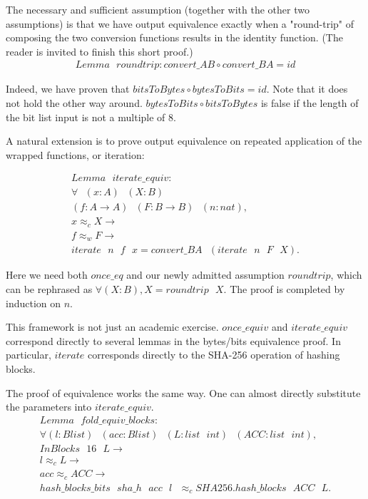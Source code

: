 \documentclass[twocolumn,showpacs,%
  nofootinbib,aps,superscriptaddress,%
  eqsecnum,prd,notitlepage,showkeys,10pt]{revtex4-1}
\newcommand{\eqn}[1] {\begin{gather*}#1\end{gather*}}
\newcommand{\spc} {\textrm{ }}
\newcommand{\s} {\textrm{ }}
\begin{document}
The necessary and sufficient assumption (together with the other two assumptions) is that we have output equivalence exactly when a "round-trip" of composing the two conversion functions results in the identity function. (The reader is invited to finish this short proof.)
\eqn{
Lemma \spc roundtrip : convert\_AB \circ convert\_BA = id }

Indeed, we have proven that $bitsToBytes \circ bytesToBits = id$. Note that it does not hold the other way around. $bytesToBits \circ bitsToBytes$ is false if the length of the bit list input is not a multiple of 8.

A natural extension is to prove output equivalence on repeated application of the wrapped functions, or iteration:



\eqn{
Lemma \spc iterate\_equiv : \\
  \forall  \spc (x : A) \spc (X : B)\\
   (f : A \rightarrow A) \spc (F : B \rightarrow B) \spc (n : nat), \\
    x \approx_c X \rightarrow \\
    f \approx_w F \rightarrow \\
    iterate \spc n \spc f \spc x = convert\_BA \spc (iterate \spc n \spc F \spc X).
}

Here we need both $once\_eq$ and our newly admitted assumption $roundtrip$, which can be rephrased as $\forall (X : B), X = roundtrip \spc X$. The proof is completed by induction on $n$.

This framework is not just an academic exercise. $once\_equiv$ and $iterate\_equiv$ correspond directly to several lemmas in the bytes/bits equivalence proof. In particular, $iterate$ corresponds directly to the SHA-256 operation of hashing blocks. 



The proof of equivalence works the same way. One can almost directly substitute the parameters into $iterate\_equiv$. 
\eqn{
Lemma \s fold\_equiv\_blocks : \\
\forall (l : Blist) \s (acc : Blist) \s (L : list \s int) \s (ACC : list \s int), \\
      InBlocks \s 16 \s L \rightarrow \\
      l \approx_c L \rightarrow \\
      acc \approx_c ACC \rightarrow \\
      hash\_blocks\_bits \s sha\_h \s acc \s l \s \approx_c SHA256.hash\_blocks \s ACC \s L.
}	
\end{document}
